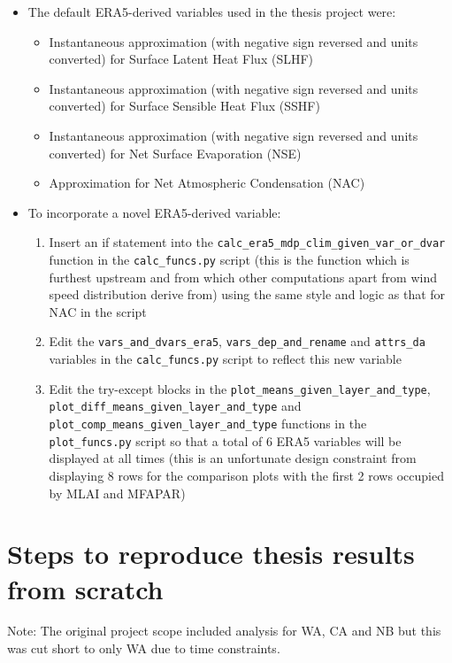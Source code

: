 \begin{itemize}
	\item The default ERA5-derived variables used in the thesis project were: 
	\begin{itemize}
		\item Instantaneous approximation (with negative sign reversed and units converted) for Surface Latent Heat Flux (SLHF)
		\item Instantaneous approximation (with negative sign reversed and units converted) for Surface Sensible Heat Flux (SSHF)
		\item Instantaneous approximation (with negative sign reversed and units converted) for Net Surface Evaporation (NSE)
		\item Approximation for Net Atmospheric Condensation (NAC)
	\end{itemize}
	\item To incorporate a novel ERA5-derived variable:
	\begin{enumerate}
		\item Insert an if statement into the \verb+calc_era5_mdp_clim_given_var_or_dvar+ function in the \verb+calc_funcs.py+ script (this is the function which is furthest upstream and from which other computations apart from wind speed distribution derive from) using the same style and logic as that for NAC in the script
		\item Edit the \verb+vars_and_dvars_era5+, \verb+vars_dep_and_rename+ and \verb+attrs_da+ variables in the \verb+calc_funcs.py+ script to reflect this new variable
		\item Edit the try-except blocks in the \verb+plot_means_given_layer_and_type+, \verb+plot_diff_means_given_layer_and_type+ and \\ \verb+plot_comp_means_given_layer_and_type+ functions in the \\ \verb+plot_funcs.py+ script so that a total of 6 ERA5 variables will be displayed at all times (this is an unfortunate design constraint from displaying 8 rows for the comparison plots with the first 2 rows occupied by MLAI and MFAPAR)
	\end{enumerate}
\end{itemize}

\section{Steps to reproduce thesis results from scratch}

Note: The original project scope included analysis for \ac{WA}, \ac{CA} and \ac{NB} but this was cut short to only \ac{WA} due to time constraints.

